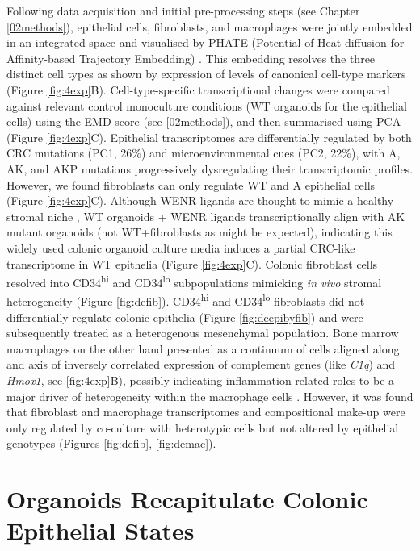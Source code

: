Following data acquisition and initial pre-processing steps (see Chapter \ref{02methods}), epithelial cells, fibroblasts, and macrophages were jointly embedded in an integrated space and visualised by PHATE (Potential of Heat-diffusion for Affinity-based Trajectory Embedding) \cite{moon_visualizing_2019}. This embedding resolves the three distinct cell types as shown by expression of levels of canonical cell-type markers (Figure \ref{fig:4exp}B). 
Cell-type-specific transcriptional changes were compared against relevant control monoculture conditions (WT organoids for the epithelial cells) using the EMD score (see \ref{02methods}), and then summarised using PCA (Figure \ref{fig:4exp}C). Epithelial transcriptomes are differentially regulated by both CRC mutations (PC1, 26\%) and microenvironmental cues (PC2, 22\%), with A, AK, and AKP mutations progressively dysregulating their transcriptomic profiles. However, we found fibroblasts can only regulate WT and A epithelial cells (Figure \ref{fig:4exp}C). Although WENR ligands are thought to mimic a healthy stromal niche \cite{mahe_establishment_2013}, WT organoids + WENR ligands transcriptionally align with AK mutant organoids (not WT+fibroblasts as might be expected), indicating this widely used colonic organoid culture media induces a partial CRC-like transcriptome in WT epithelia (Figure \ref{fig:4exp}C).
Colonic fibroblast cells resolved into CD34\textsuperscript{hi} and CD34\textsuperscript{lo} subpopulations mimicking \textit{in vivo} stromal heterogeneity \cite{karpus_colonic_2019} (Figure \ref{fig:defib}). CD34\textsuperscript{hi} and CD34\textsuperscript{lo} fibroblasts did not differentially regulate colonic epithelia (Figure \ref{fig:deepibyfib}) and were subsequently treated as a heterogenous mesenchymal population. Bone marrow macrophages on the other hand presented as a continuum of cells aligned along and axis of inversely correlated expression of complement genes (like \emph{C1q}) and \emph{Hmox1}, see \ref{fig:4exp}B), possibly indicating inflammation-related roles to be a major driver of heterogeneity within the macrophage cells \cite{naito_heme_2014}. However, it was found that fibroblast and macrophage transcriptomes and compositional make-up were only regulated by co-culture with heterotypic cells but not altered by epithelial genotypes (Figures \ref{fig:defib}, \ref{fig:demac}). 

\newpage
\section{Organoids Recapitulate Colonic Epithelial States}

